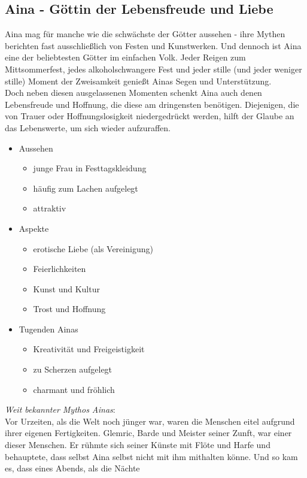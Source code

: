 \subsection{\textbf{Aina} - Göttin der Lebensfreude und Liebe}
Aina mag für manche wie die schwächste der Götter aussehen - ihre Mythen berichten fast ausschließlich von Festen und Kunstwerken. Und dennoch ist Aina eine der beliebtesten 
Götter im einfachen Volk. Jeder Reigen zum Mittsommerfest, jedes alkoholschwangere Fest und jeder stille (und jeder weniger stille) Moment der Zweisamkeit genießt Ainas Segen 
und Unterstützung.\\
Doch neben diesen ausgelassenen Momenten schenkt Aina auch denen Lebensfreude und Hoffnung, die diese am dringensten benötigen. Diejenigen, die von Trauer oder 
Hoffnungslosigkeit niedergedrückt werden, hilft der Glaube an das Lebenswerte, um sich wieder aufzuraffen.
\begin{itemize}
	\item Aussehen 
	\begin{itemize}
		\item junge Frau in Festtagskleidung
		\item häufig zum Lachen aufgelegt
		\item attraktiv 
	\end{itemize}
	\item Aspekte
	\begin{itemize}
		\item erotische Liebe (als Vereinigung)
		\item Feierlichkeiten
		\item Kunst und Kultur
		\item Trost und Hoffnung
	\end{itemize}
	\item Tugenden Ainas
	\begin{itemize}
		\item Kreativität und Freigeistigkeit
		\item zu Scherzen aufgelegt
		\item charmant und fröhlich
	\end{itemize}
\end{itemize}
\textit{Weit bekannter Mythos Ainas}:\\
Vor Urzeiten, als die Welt noch jünger war, waren die Menschen eitel aufgrund ihrer eigenen Fertigkeiten. Glemric, Barde und Meister seiner Zunft, war einer dieser Menschen. 
Er rühmte sich seiner Künste mit Flöte und Harfe und behauptete, dass selbst Aina selbst nicht mit ihm mithalten könne. Und so kam es, dass eines Abends, als die Nächte 
